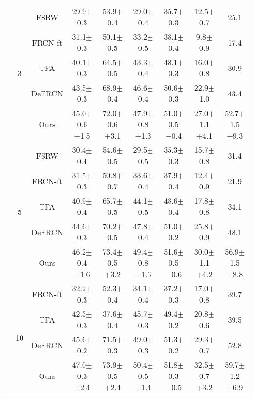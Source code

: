 \documentclass{article}
\begin{document}
\begin{table}[hbt!]
\begin{adjustbox}{width=0.79\textwidth}
{\begin{tabular}{c|c|c|ccc|c|cc}
         &\multirow{5}{*}{3}&FSRW \cite{metayolo} &29.9$\pm$0.3&53.9$\pm$0.4&29.0$\pm$0.4&35.7$\pm$0.3&12.5$\pm$0.7&25.1  \\
         &&FRCN-ft \cite{metarcnn}&31.1$\pm$0.3&50.1$\pm$0.5&33.2$\pm$0.5&38.1$\pm$0.4&9.8$\pm$0.9&17.4\\
         &&TFA \cite{tfa}&40.1$\pm$0.3&64.5$\pm$0.5&43.3$\pm$0.4&48.1$\pm$0.3&16.0$\pm$0.8&30.9\\
         &&DeFRCN \cite{defrcn}&43.5$\pm$0.3&68.9$\pm$0.4&46.6$\pm$0.4&50.6$\pm$0.3&22.9$\pm$1.0&43.4\\
         && \cellcolor{gray!30}Ours&\cellcolor{gray!30}45.0$\pm$0.6 {\scriptsize \color{red}+1.5}&\cellcolor{gray!30}72.0$\pm$0.6 {\scriptsize \color{red}+3.1}&\cellcolor{gray!30}47.9$\pm$0.8 {\scriptsize \color{red}+1.3}&\cellcolor{gray!30}51.0$\pm$0.5 {\scriptsize \color{red}+0.4}&\cellcolor{gray!30}27.0$\pm$1.1 {\scriptsize \color{red}+4.1}&\cellcolor{gray!30}52.7$\pm$1.5 {\scriptsize \color{red}+9.3}\\
         \cmidrule{2-9}
         &\multirow{5}{*}{5}&FSRW \cite{metayolo} & 30.4$\pm$0.4&54.6$\pm$0.5&29.5$\pm$0.5&35.3$\pm$0.3&15.7$\pm$0.8&31.4  \\
         &&FRCN-ft \cite{metarcnn}&31.5$\pm$0.3&50.8$\pm$0.7&33.6$\pm$0.4&37.9$\pm$0.4&12.4$\pm$0.9&21.9\\
         &&TFA \cite{tfa}&40.9$\pm$0.4&65.7$\pm$0.5&44.1$\pm$0.5&48.6$\pm$0.4&17.8$\pm$0.8&34.1\\
         &&DeFRCN \cite{defrcn}&44.6$\pm$0.3&70.2$\pm$0.5&47.8$\pm$0.4&51.0$\pm$0.2&25.8$\pm$0.9&48.1\\
         && \cellcolor{gray!30}Ours&\cellcolor{gray!30}46.2$\pm$0.4 {\scriptsize \color{red}+1.6}&\cellcolor{gray!30}73.4$\pm$0.5 {\scriptsize \color{red}+3.2}&\cellcolor{gray!30}49.4$\pm$0.8 {\scriptsize \color{red}+1.6}&\cellcolor{gray!30}51.6$\pm$0.5 {\scriptsize \color{red}+0.6}&\cellcolor{gray!30}30.0$\pm$1.1 {\scriptsize \color{red}+4.2}&\cellcolor{gray!30}56.9$\pm$1.5 {\scriptsize \color{red}+8.8}\\
         \cmidrule{2-9}
         &\multirow{5}{*}{10}&FRCN-ft \cite{metarcnn}&32.2$\pm$0.3&52.3$\pm$0.4&34.1$\pm$0.4&37.2$\pm$0.3&17.0$\pm$0.8&39.7\\
         &&TFA \cite{tfa}&42.3$\pm$0.3&37.6$\pm$0.4&45.7$\pm$0.3&49.4$\pm$0.2&20.8$\pm$0.6&39.5\\
         &&DeFRCN \cite{defrcn}&45.6$\pm$0.2&71.5$\pm$0.3&49.0$\pm$0.3&51.3$\pm$0.2&29.3$\pm$0.7&52.8\\
         && \cellcolor{gray!30}Ours&\cellcolor{gray!30}47.0$\pm$0.3 {\scriptsize \color{red}+2.4}&\cellcolor{gray!30}73.9$\pm$0.5 {\scriptsize \color{red}+2.4}&\cellcolor{gray!30}50.4$\pm$0.5 {\scriptsize \color{red}+1.4}&\cellcolor{gray!30}51.8$\pm$0.3 {\scriptsize \color{red}+0.5}&\cellcolor{gray!30}32.5$\pm$0.7 {\scriptsize \color{red}+3.2}&\cellcolor{gray!30}59.7$\pm$1.2 {\scriptsize \color{red}+6.9}\\

\end{tabular}}
\end{adjustbox}
\end{table}
\end{document}
